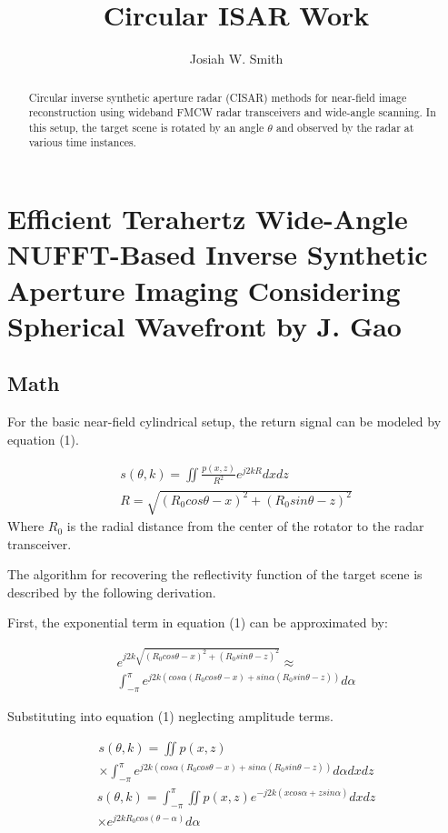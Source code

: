 \documentclass{IEEEtran}
\title{Circular ISAR Work}
\author{Josiah W. Smith}
\begin{document}
	
\maketitle
	
\begin{abstract}
	Circular inverse synthetic aperture radar (CISAR) methods for near-field image reconstruction using wideband FMCW radar transceivers and wide-angle scanning. In this setup, the target scene is rotated by an angle $\theta$ and observed by the radar at various time instances.
\end{abstract}

\section{Efficient Terahertz Wide-Angle NUFFT-Based Inverse
	Synthetic Aperture Imaging Considering
	Spherical Wavefront by J. Gao}

\subsection{Math}

For the basic near-field cylindrical setup, the return signal can be modeled by equation (1).

\begin{gather}
s(\theta,k) = \iint \frac{p(x,z)}{R^2}e^{j2kR}dxdz \\
R = \sqrt{(R_0 cos\theta - x)^2 + (R_0 sin\theta - z)^2}
\end{gather}
Where $R_0$ is the radial distance from the center of the rotator to the radar transceiver.

The algorithm for recovering the reflectivity function of the target scene is described by the following derivation.

First, the exponential term in equation (1) can be approximated by:

\begin{multline}
e^{j2k\sqrt{(R_0 cos\theta - x)^2 + (R_0 sin\theta - z)^2}} \approx \\ \int_{-\pi}^{\pi} e^{j2k(cos\alpha(R_0cos\theta-x)+sin\alpha(R_0sin\theta - z))} d\alpha
\end{multline}

Substituting into equation (1) neglecting amplitude terms.

\begin{multline}
s(\theta,k) = \iint p(x,z) \\ 
\times \int_{-\pi}^{\pi} e^{j2k(cos\alpha(R_0cos\theta-x)+sin\alpha(R_0sin\theta - z))} d\alpha dx dz
\end{multline}
\begin{multline}
s(\theta,k) = \int_{-\pi}^{\pi} \iint p(x,z) e^{-j2k(xcos\alpha+zsin\alpha)}dxdz \\
\times e^{j2kR_0cos(\theta-\alpha)}d\alpha
\end{multline}
\end{document}

